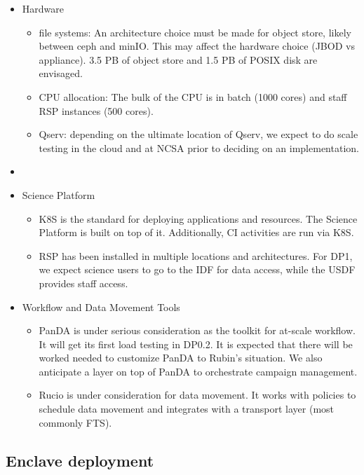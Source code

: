 \begin{itemize}
  \item Hardware
  \begin{itemize}
    \item file systems: An architecture choice must be made for object
      store, likely between ceph and minIO. This may affect the
      hardware choice (JBOD vs appliance). 3.5 PB of object store and
      1.5 PB of POSIX disk are envisaged.
    \item CPU allocation: The bulk of the CPU is in batch (1000 cores)
      and staff RSP instances (500 cores).
      \item Qserv: depending on the ultimate location of Qserv, we
        expect to do scale testing in the cloud and at NCSA prior to
        deciding on an implementation. 
  \end{itemize}

\item
  \item Science Platform
  \begin{itemize}
      \item \gls{K8S} is the standard for deploying applications and
        resources. The Science Platform is built on top of
        it. Additionally, \gls{CI} activities are run via K8S.
      \item \gls{RSP} has been installed in multiple locations and
        architectures. For DP1, we expect science users to go to the
        IDF for data access, while the USDF provides staff access.
  \end{itemize}

\item Workflow and Data Movement Tools
\begin{itemize}
      \item \gls{PanDA} is under serious consideration as the toolkit
        for at-scale workflow. It will get its first load testing in
        DP0.2. It is expected that there will be worked needed to
        customize PanDA to Rubin's situation. We also anticipate a
        layer on top of PanDA to orchestrate campaign management.
      \item Rucio is under consideration for data movement. It
       works with policies to schedule data movement and integrates
       with a transport layer (most commonly FTS).
  \end{itemize}

\end{itemize}

\subsection {Enclave deployment}


